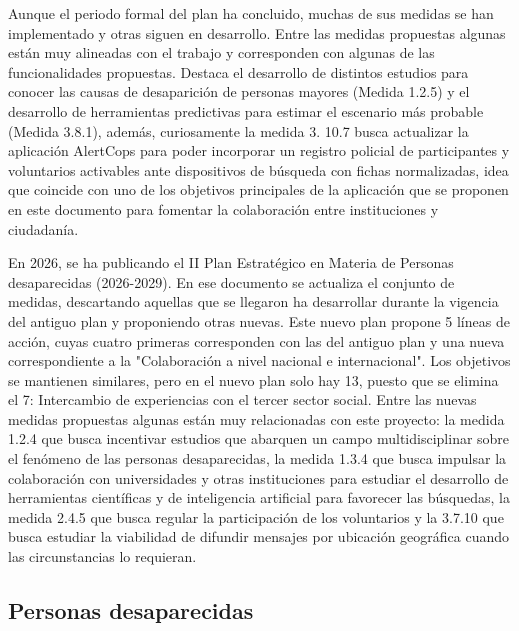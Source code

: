 Aunque el periodo formal del plan ha concluido, muchas de sus medidas se han implementado y otras siguen en desarrollo. Entre las medidas propuestas algunas están muy alineadas con el trabajo y corresponden con algunas de las funcionalidades propuestas. Destaca el desarrollo de distintos estudios para conocer las causas de desaparición de personas mayores (Medida 1.2.5) y el desarrollo de herramientas predictivas para estimar el escenario más probable (Medida 3.8.1), además, curiosamente la medida 3. 10.7 busca actualizar la aplicación AlertCops para poder incorporar un registro policial de participantes y voluntarios activables ante dispositivos de búsqueda con fichas normalizadas, idea que coincide con uno de los objetivos principales de la aplicación que se proponen en este documento para fomentar la colaboración entre instituciones y ciudadanía.

En 2026, se ha publicando el II Plan Estratégico en Materia de Personas desaparecidas (2026-2029)\cite{plan_desaparecidos_2026}. En ese documento se actualiza el conjunto de medidas, descartando aquellas que se llegaron ha desarrollar durante la vigencia del antiguo plan y proponiendo otras nuevas. Este nuevo plan propone 5 líneas de acción, cuyas cuatro primeras corresponden con las del antiguo plan y una nueva correspondiente a la "Colaboración a nivel nacional e internacional". Los objetivos se mantienen similares, pero en el nuevo plan solo hay 13, puesto que se elimina el 7: Intercambio de experiencias con el tercer sector social. Entre las nuevas medidas propuestas algunas están muy relacionadas con este proyecto: la medida 1.2.4 que busca incentivar estudios que abarquen un campo multidisciplinar sobre el fenómeno de las personas desaparecidas, la medida 1.3.4 que busca impulsar la colaboración con universidades y otras instituciones para estudiar el desarrollo de herramientas científicas y de inteligencia artificial para favorecer las búsquedas, la medida 2.4.5 que busca regular la participación de los voluntarios y la 3.7.10 que busca estudiar la viabilidad de difundir mensajes por ubicación geográfica cuando las circunstancias lo requieran.



    
    \subsection{Personas desaparecidas}

